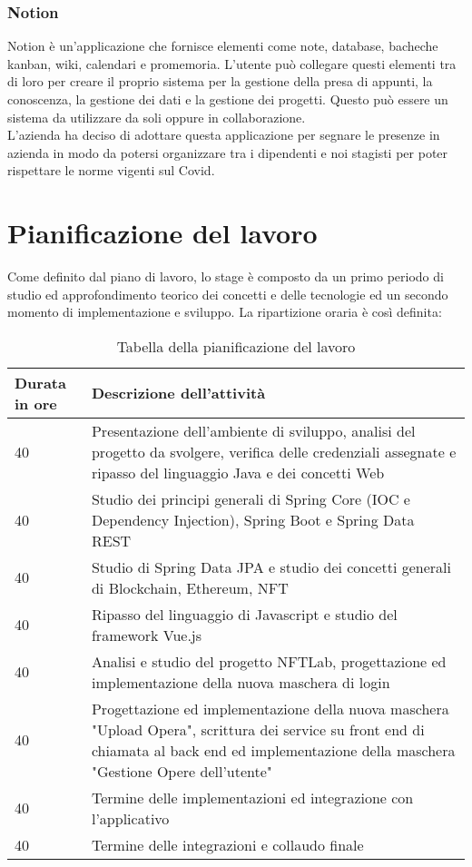 \subsubsection{Notion}
Notion è un'applicazione che fornisce elementi come note, database, bacheche kanban, wiki, calendari e promemoria. L'utente può collegare questi elementi tra di loro per creare il proprio sistema per la gestione della presa di appunti, la conoscenza, la gestione dei dati e la gestione dei progetti. Questo può essere un sistema da utilizzare da soli oppure in collaborazione.\\
L'azienda ha deciso di adottare questa applicazione per segnare le presenze in azienda in modo da potersi organizzare tra i dipendenti e noi stagisti per poter rispettare le norme vigenti sul Covid.

\section{Pianificazione del lavoro}
Come definito dal piano di lavoro, lo stage è composto da un primo periodo di studio ed approfondimento teorico dei concetti e delle tecnologie ed un secondo momento di implementazione e sviluppo. La ripartizione oraria è così definita:
\begin{table}[H]
	\renewcommand{\arraystretch}{1.6}
	\begin{tabularx}{\textwidth}{lX}
		\hline
		\textbf{Durata in ore} & \textbf{Descrizione dell'attività}\\
		\hline
		40 & Presentazione dell'ambiente di sviluppo, analisi del progetto da svolgere, verifica delle credenziali assegnate e ripasso del linguaggio Java e dei concetti Web\\
		\hline
		40 & Studio dei principi generali di Spring Core (IOC e Dependency Injection), Spring Boot e Spring Data REST \\
		\hline
		40 & Studio di Spring Data JPA e studio dei concetti generali di Blockchain, Ethereum, NFT\\
		\hline
		40 & Ripasso del linguaggio di Javascript e studio del framework Vue.js\\
		\hline
		40 & Analisi e studio del progetto NFTLab, progettazione ed implementazione della nuova maschera di login\\
		\hline
		40 & Progettazione ed implementazione della nuova maschera "Upload Opera", scrittura dei service su front end di chiamata al back end ed implementazione della maschera "Gestione Opere dell'utente"\\
		\hline
		40 & Termine delle implementazioni ed integrazione con l'applicativo\\
		\hline
		40 & Termine delle integrazioni e collaudo finale\\
		\hline
	\end{tabularx}
	\label{tab:pianificazione-del-lavoro}
	\caption{Tabella della pianificazione del lavoro}
\end{table}%

